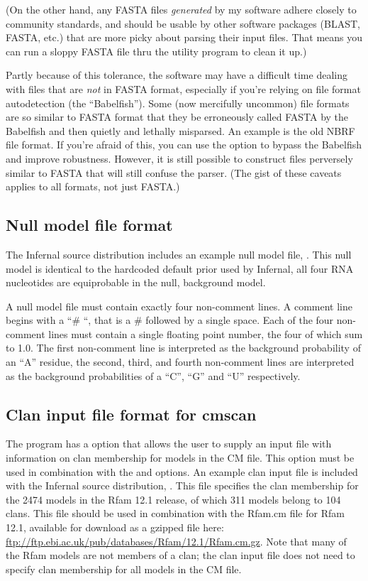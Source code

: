 (On the other hand, any FASTA files \emph{generated} by my software
adhere closely to community standards, and should be usable by other
software packages (BLAST, FASTA, etc.) that are more picky about
parsing their input files. That means you can run a sloppy FASTA file
thru the  utility program to clean it up.)

Partly because of this tolerance, the software may have a difficult
time dealing with files that are \textit{not} in FASTA format,
especially if you're relying on file format autodetection (the
``Babelfish'').  Some (now mercifully uncommon) file formats are so
similar to FASTA format that they be erroneously called FASTA by the
Babelfish and then quietly and lethally misparsed. An example is the
old NBRF file format. If you're afraid of this, you can use the
 option to bypass the Babelfish and improve
robustness. However, it is still possible to construct files
perversely similar to FASTA that will still confuse the parser.  (The
gist of these caveats applies to all formats, not just FASTA.)

\subsection{Null model file format}

The Infernal source distribution includes an example null model file, 
. This null model is identical to the hardcoded default
prior used by Infernal, all four RNA nucleotides are equiprobable in
the null, background model. 

A null model file must contain exactly four non-comment lines. A
comment line begins with a ``\# ``, that is a \# followed by a single
space. Each of the four non-comment lines must contain a single floating point
number, the four of which sum to 1.0. The first non-comment line is interpreted as
the background probability of an ``A'' residue, the second, third, and
fourth non-comment lines are interpreted as the background
probabilities of a ``C'', ``G'' and ``U'' respectively. 

\subsection{Clan input file format for cmscan}

The  program has a  option that
allows the user to supply an input file  with information
on clan membership for models in the CM file. This option must be used
in combination with the  and 
options. An example clan input file is included with the Infernal
source distribution, . This file
specifies the clan membership for the 2474 models in the Rfam 12.1
release, of which 311 models belong to 104 clans. This file should be
used in combination with the Rfam.cm file for Rfam 12.1, available for
download as a gzipped file here:
\url{ftp://ftp.ebi.ac.uk/pub/databases/Rfam/12.1/Rfam.cm.gz}. Note that
many of the Rfam models are not members of a clan; the clan input file does
not need to specify clan membership for all models in the CM file.


